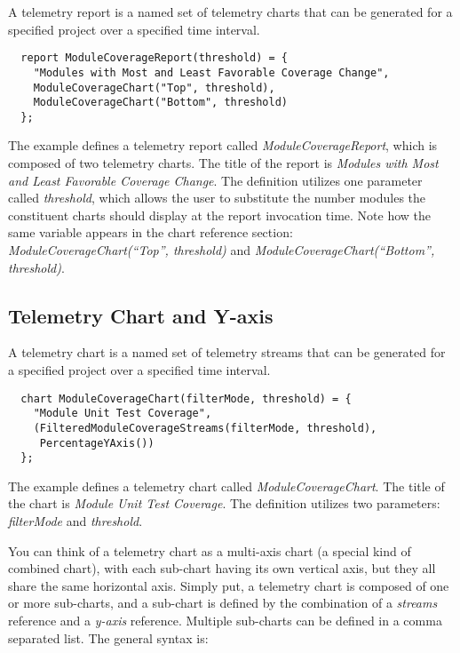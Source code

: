 A telemetry report is a named set of telemetry charts that can be generated for a specified project over a specified time interval.

\begin{verbatim}
  report ModuleCoverageReport(threshold) = {
    "Modules with Most and Least Favorable Coverage Change",
    ModuleCoverageChart("Top", threshold),
    ModuleCoverageChart("Bottom", threshold)
  };
\end{verbatim}
  
The example defines a telemetry report called \textit{ModuleCoverageReport}, which is composed of two telemetry charts. The title of the report is \textit{Modules with Most and Least Favorable Coverage Change}. The definition utilizes one parameter called \textit{threshold}, which allows the user to substitute the number modules the constituent charts should display at the report invocation time. Note how the same variable appears in the chart reference section: \textit{ModuleCoverageChart(``Top'', threshold)} and \textit{ModuleCoverageChart(``Bottom'', threshold)}.


\subsection{Telemetry Chart and Y-axis}

A telemetry chart is a named set of telemetry streams that can be generated for a specified project over a specified time interval.

\begin{verbatim}
  chart ModuleCoverageChart(filterMode, threshold) = {
    "Module Unit Test Coverage", 
    (FilteredModuleCoverageStreams(filterMode, threshold), 
     PercentageYAxis()) 
  };
\end{verbatim}

The example defines a telemetry chart called \textit{ModuleCoverageChart}. The title of the chart is \textit{Module Unit Test Coverage}. The definition utilizes two parameters: \textit{filterMode} and \textit{threshold}.  

You can think of a telemetry chart as a multi-axis chart (a special kind of combined chart), with each sub-chart having its own vertical axis, but they all share the same horizontal axis. Simply put, a telemetry chart is composed of one or more sub-charts, and a sub-chart is defined by the combination of a \textit{streams} reference and a \textit{y-axis} reference. Multiple sub-charts can be defined in a comma separated list. The general syntax is:

